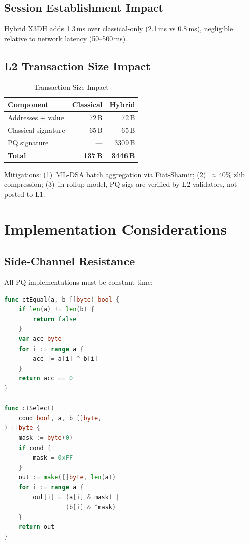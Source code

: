 \documentclass[11pt,a4paper]{article}
\begin{document}
\subsection{Session Establishment Impact}

Hybrid X3DH adds 1.3\,ms over classical-only (2.1\,ms vs 0.8\,ms),
negligible relative to network latency (50--500\,ms).

\subsection{L2 Transaction Size Impact}

\begin{table}[h]
\centering
\caption{Transaction Size Impact}
\label{tab:tx-size}
\begin{tabular}{@{}lrr@{}}
\toprule
\textbf{Component} & \textbf{Classical} & \textbf{Hybrid} \\
\midrule
Addresses + value    & 72\,B    & 72\,B \\
Classical signature  & 65\,B    & 65\,B \\
PQ signature         & ---      & 3309\,B \\
\midrule
\textbf{Total}       & \textbf{137\,B} & \textbf{3446\,B} \\
\bottomrule
\end{tabular}
\end{table}

Mitigations: (1)~ML-DSA batch aggregation via Fiat-Shamir;
(2)~$\approx 40\%$ zlib compression; (3)~in rollup model, PQ sigs are
verified by L2 validators, not posted to L1.

\section{Implementation Considerations}
\label{sec:implementation}

\subsection{Side-Channel Resistance}

All PQ implementations must be constant-time:

\begin{lstlisting}[language=Go,caption={Constant-Time Utilities}]
func ctEqual(a, b []byte) bool {
    if len(a) != len(b) {
        return false
    }
    var acc byte
    for i := range a {
        acc |= a[i] ^ b[i]
    }
    return acc == 0
}

func ctSelect(
    cond bool, a, b []byte,
) []byte {
    mask := byte(0)
    if cond {
        mask = 0xFF
    }
    out := make([]byte, len(a))
    for i := range a {
        out[i] = (a[i] & mask) |
                 (b[i] & ^mask)
    }
    return out
}
\end{lstlisting}
\end{document}
